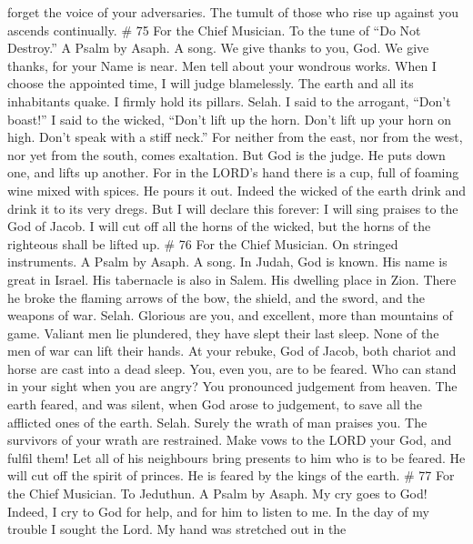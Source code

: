 forget the voice of your adversaries. The tumult of those who rise up
against you ascends continually. \# 75 For the Chief Musician. To the
tune of ``Do Not Destroy.'' A Psalm by Asaph. A song.  We
give thanks to you, God. We give thanks, for your Name is near. Men tell
about your wondrous works.  When I choose the appointed
time, I will judge blamelessly.  The earth and all its
inhabitants quake. I firmly hold its pillars. Selah.  I said
to the arrogant, ``Don't boast!'' I said to the wicked, ``Don't lift up
the horn.  Don't lift up your horn on high. Don't speak with
a stiff neck.''  For neither from the east, nor from the
west, nor yet from the south, comes exaltation.  But God is
the judge. He puts down one, and lifts up another.  For in
the LORD's hand there is a cup, full of foaming wine mixed with spices.
He pours it out. Indeed the wicked of the earth drink and drink it to
its very dregs.  But I will declare this forever: I will
sing praises to the God of Jacob.  I will cut off all the
horns of the wicked, but the horns of the righteous shall be lifted up.
\# 76 For the Chief Musician. On stringed instruments. A Psalm by Asaph.
A song.  In Judah, God is known. His name is great in
Israel.  His tabernacle is also in Salem. His dwelling place
in Zion.  There he broke the flaming arrows of the bow, the
shield, and the sword, and the weapons of war. Selah. 
Glorious are you, and excellent, more than mountains of game.
 Valiant men lie plundered, they have slept their last
sleep. None of the men of war can lift their hands.  At your
rebuke, God of Jacob, both chariot and horse are cast into a dead sleep.
 You, even you, are to be feared. Who can stand in your
sight when you are angry?  You pronounced judgement from
heaven. The earth feared, and was silent,  when God arose to
judgement, to save all the afflicted ones of the earth. Selah.
 Surely the wrath of man praises you. The survivors of your
wrath are restrained.  Make vows to the LORD your God, and
fulfil them! Let all of his neighbours bring presents to him who is to
be feared.  He will cut off the spirit of princes. He is
feared by the kings of the earth. \# 77 For the Chief Musician. To
Jeduthun. A Psalm by Asaph.  My cry goes to God! Indeed, I
cry to God for help, and for him to listen to me.  In the
day of my trouble I sought the Lord. My hand was stretched out in the
